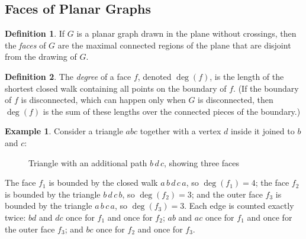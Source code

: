 \documentclass{article}
\theoremstyle{definition}
\newtheorem{example}{Example}
\newtheorem{definition}{Definition}
\begin{document}
\subsection{Faces of Planar Graphs}
\begin{definition}
If $G$ is a planar graph drawn in the plane without crossings, then the \textit{faces} of $G$ are the maximal connected regions of the plane that are disjoint from the drawing of $G$.
\end{definition}

\begin{definition}
The \textit{degree} of a face $f$, denoted $\deg(f)$, is the length of the shortest closed walk containing all points on the boundary of $f$. (If the boundary of $f$ is disconnected, which can happen only when $G$ is disconnected, then $\deg(f)$ is the sum of these lengths over the connected pieces of the boundary.)
\end{definition}

\begin{example}
Consider a triangle $abc$ together with a vertex $d$ inside it joined to $b$ and $c$:

\begin{figure}[ht]
\centering
{}
\caption{Triangle with an additional path $b\,d\,c$, showing three faces}
\label{fig:faces_example}
\end{figure}

The face $f_1$ is bounded by the closed walk $a\,b\,d\,c\,a$, so $\deg(f_1) = 4$; the face $f_2$ is bounded by the triangle $b\,d\,c\,b$, so $\deg(f_2) = 3$; and the outer face $f_3$ is bounded by the triangle $a\,b\,c\,a$, so $\deg(f_3) = 3$. Each edge is counted exactly twice: $bd$ and $dc$ once for $f_1$ and once for $f_2$; $ab$ and $ac$ once for $f_1$ and once for the outer face $f_3$; and $bc$ once for $f_2$ and once for $f_3$.
\end{example}
\end{document}
